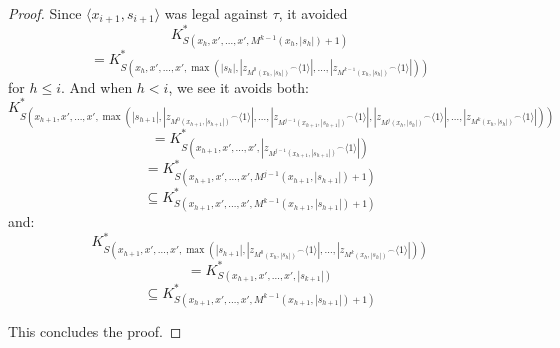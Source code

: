 \documentclass[11pt]{article}
\theoremstyle{plain}
\theoremstyle{definition}
\theoremstyle{remark}
\newcommand{\<}{\langle}
\renewcommand{\>}{\rangle}
\begin{document}
\begin{proof}
Since $\<x_{i+1},s_{i+1}\>$ was legal against $\tau$, it avoided
  \[
    K^*_{S(x_h,x',\dots,x',M^{k-1}(x_h,|s_h|)+1)} 
  \]
  \[
    = 
    K^*_{S(x_h,x',\dots,x',\max(|s_h|,|{z_{M^{0}(x_h,|s_h|)}}^\frown\<1\>|,\dots,|{z_{M^{k-1}(x_h,|s_h|)}}^\frown\<1\>|))}
  \]
for $h\leq i$. And when $h<i$, we see it avoids both:
  \[
    K^*_{S(x_{h+1},x',\dots,x',\max(|s_{h+1}|,|{z_{M^0(x_{h+1},|s_{h+1}|)}}^\frown\<1\>|,\dots,|{z_{M^{j-1}(x_{h+1},|s_{h+1}|)}}^\frown\<1\>|,|{z_{M^{j}(x_{h},|s_{h}|)}}^\frown\<1\>|,\dots,|{z_{M^{k}(x_{h},|s_{h}|)}}^\frown\<1\>|))} 
  \]
  \[
    =
    K^*_{S(x_{h+1},x',\dots,x',|{z_{M^{j-1}(x_{h+1},|s_{h+1}|)}}^\frown\<1\>|)}
  \]
  \[
    =
    K^*_{S(x_{h+1},x',\dots,x',M^{j-1}(x_{h+1},|s_{h+1}|)+1)}
  \]
  \[
    \subseteq
    K^*_{S(x_{h+1},x',\dots,x',M^{k-1}(x_{h+1},|s_{h+1}|)+1)}
  \]
and:
  \[
    K^*_{S(x_{h+1},x',\dots,x',\max(|s_{h+1}|,|{z_{M^0(x_{h},|s_{h}|)}}^\frown\<1\>|,\dots,|{z_{M^{k}(x_{h},|s_{h}|)}}^\frown\<1\>|))} 
  \]
  \[
    =
    K^*_{S(x_{h+1},x',\dots,x',|s_{k+1}|)}
  \]
  \[
    \subseteq
    K^*_{S(x_{h+1},x',\dots,x',M^{k-1}(x_{h+1},|s_{h+1}|)+1)}
  \]


This concludes the proof.
\end{proof}
\end{document}
